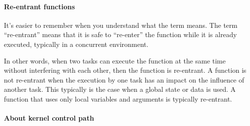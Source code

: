 \paragraph{Re-entrant functions}

It's easier to remember when you understand what the term means. The term ``re-entrant''
means that it is safe to ``re-enter'' the function while it is already executed, typically
in a concurrent environment.

In other words, when two tasks can execute the function at the same time without
interfering with each other, then the function is re-entrant. A function is not re-entrant
when the execution by one task has an impact on the influence of another task. This
typically is the case when a global state or data is used. A function that uses only local
variables and arguments is typically re-entrant.

\paragraph{About kernel control path}

